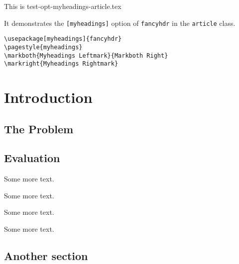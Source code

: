 \documentclass[twoside]{article}
\begin{document}
\tableofcontents

\bigskip

\noindent
\begin{boxedminipage}{\textwidth}
  This is test-opt-myheadings-article.tex

  It demonstrates the \texttt{[myheadings]} option of \texttt{fancyhdr} in
  the \texttt{article} class.

\begin{verbatim}
\usepackage[myheadings]{fancyhdr}
\pagestyle{myheadings}
\markboth{Myheadings Leftmark}{Markboth Right}
\markright{Myheadings Rightmark}
\end{verbatim}
\end{boxedminipage}

\section{Introduction}

\lipsum

\subsection{The Problem}
\label{sec:problem}

\lipsum[1]

\subsection{Evaluation}

\lipsum[2-4]

Some more text.

Some more text.

Some more text.

Some more text.

\subsection{Another section}

\lipsum[3]
\end{document}

